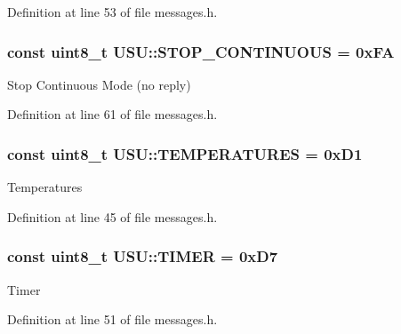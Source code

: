 \-Definition at line 53 of file messages.\-h.

\hypertarget{namespace_u_s_u_ae7447325a101912b787905199c4f2acb}{
\subsubsection[{\-S\-T\-O\-P\-\_\-\-C\-O\-N\-T\-I\-N\-U\-O\-U\-S}]{\setlength{\rightskip}{0pt plus 5cm}const uint8\-\_\-t {\bf \-U\-S\-U\-::\-S\-T\-O\-P\-\_\-\-C\-O\-N\-T\-I\-N\-U\-O\-U\-S} = 0x\-F\-A}}\label{namespace_u_s_u_ae7447325a101912b787905199c4f2acb}
\-Stop \-Continuous \-Mode (no reply) 

\-Definition at line 61 of file messages.\-h.

\hypertarget{namespace_u_s_u_ac5f57d308aea3cdda7c0a2ddade6996b}{
\subsubsection[{\-T\-E\-M\-P\-E\-R\-A\-T\-U\-R\-E\-S}]{\setlength{\rightskip}{0pt plus 5cm}const uint8\-\_\-t {\bf \-U\-S\-U\-::\-T\-E\-M\-P\-E\-R\-A\-T\-U\-R\-E\-S} = 0x\-D1}}\label{namespace_u_s_u_ac5f57d308aea3cdda7c0a2ddade6996b}
\-Temperatures 

\-Definition at line 45 of file messages.\-h.

\hypertarget{namespace_u_s_u_abed08045a54f63e04380a2ac80bcaf79}{
\subsubsection[{\-T\-I\-M\-E\-R}]{\setlength{\rightskip}{0pt plus 5cm}const uint8\-\_\-t {\bf \-U\-S\-U\-::\-T\-I\-M\-E\-R} = 0x\-D7}}\label{namespace_u_s_u_abed08045a54f63e04380a2ac80bcaf79}
\-Timer 

\-Definition at line 51 of file messages.\-h.

